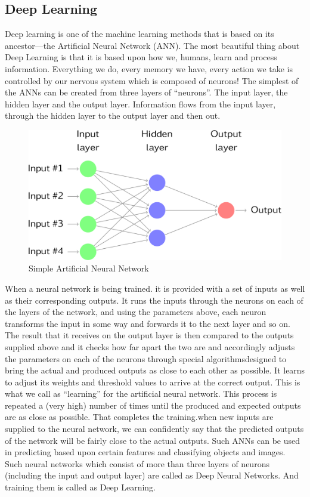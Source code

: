 \subsection{Deep Learning}
Deep learning is one of the machine learning methods that is based on its ancestor—the Artiﬁcial Neural Network (ANN).
The most beautiful thing about Deep Learning is that it is based upon how we, humans, learn and process information. Everything we do, every memory we have, every action we take is controlled by our nervous system which is composed of neurons! The simplest of the ANNs can be created from three layers of “neurons”. The input layer, the hidden layer and the output layer. Information flows from the input layer, through the hidden layer to the output layer and then out.\linebreak
\begin{figure}[h]
\label{ss}
\centering
\includegraphics[width= 14 cm]{deep.png}
\caption{Simple Artificial Neural Network}
\end{figure} \linebreak

When a neural network is being trained. it is provided with a set of inputs as well as their corresponding outputs. It runs the inputs through the neurons on each of the layers of the network, and using the parameters above, each neuron transforms the input in some way and forwards it to the next layer and so on. The result that it receives on the output layer is then compared to the outputs supplied above and it checks how far apart the two are and accordingly adjusts the parameters on each of the neurons through special algorithmsdesigned to bring the actual and produced outputs as close to each other as possible. It learns to adjust its weights and threshold values to arrive at the correct output. This is what we call as “learning” for the artificial neural network. This process is repeated a (very high) number of times until the produced and expected outputs are as close as possible. That completes the training.when new inputs are supplied to the neural network, we can confidently say that the predicted outputs of the network will be fairly close to the actual outputs. Such ANNs can be used in predicting based upon certain features and classifying objects and images.\\
Such neural networks which consist of more than three layers of neurons (including the input and output layer) are called as Deep Neural Networks. And training them is called as Deep Learning. \linebreak


